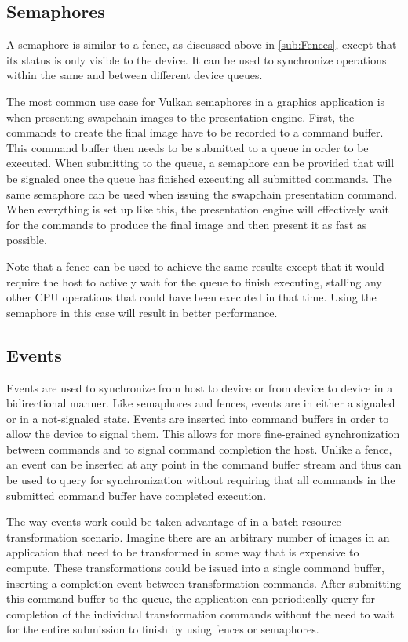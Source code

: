     \subsection{Semaphores}
    \label{sub:Semaphores}
      A semaphore is similar to a fence, as discussed above in \ref{sub:Fences}, except that its status is only visible to the device. It can be used to synchronize operations within the same and between different device queues.

      The most common use case for Vulkan semaphores in a graphics application is when presenting swapchain images to the presentation engine. First, the commands to create the final image have to be recorded to a command buffer. This command buffer then needs to be submitted to a queue in order to be executed. When submitting to the queue, a semaphore can be provided that will be signaled once the queue has finished executing all submitted commands. The same semaphore can be used when issuing the swapchain presentation command. When everything is set up like this, the presentation engine will effectively wait for the commands to produce the final image and then present it as fast as possible.

      Note that a fence can be used to achieve the same results except that it would require the host to actively wait for the queue to finish executing, stalling any other CPU operations that could have been executed in that time. Using the semaphore in this case will result in better performance.

    \subsection{Events}
    \label{sub:Events}
      Events are used to synchronize from host to device or from device to device in a bidirectional manner. Like semaphores and fences, events are in either a signaled or in a not-signaled state. Events are inserted into command buffers in order to allow the device to signal them. This allows for more fine-grained synchronization between commands and to signal command completion the host. Unlike a fence, an event can be inserted at any point in the command buffer stream and thus can be used to query for synchronization without requiring that all commands in the submitted command buffer have completed execution.

      The way events work could be taken advantage of in a batch resource transformation scenario. Imagine there are an arbitrary number of images in an application that need to be transformed in some way that is expensive to compute. These transformations could be issued into a single command buffer, inserting a completion event between transformation commands. After submitting this command buffer to the queue, the application can periodically query for completion of the individual transformation commands without the need to wait for the entire submission to finish by using fences or semaphores.

